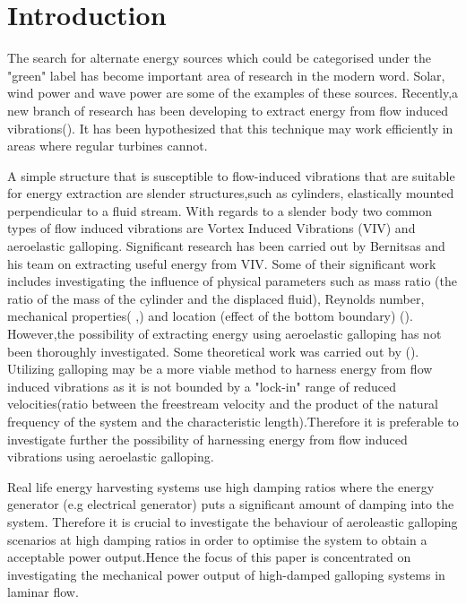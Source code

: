 \section{Introduction} 

The search for alternate energy sources which could be categorised  under the "green" label has become important area of research in the modern word. Solar, wind power and wave power are some of the examples of these sources.  Recently,a new branch of research has been developing to extract energy from flow induced vibrations(\cite{Bernitsas2008a-concept}). It has been hypothesized that this technique may work efficiently in areas where regular turbines cannot. 

A simple structure that is susceptible to flow-induced vibrations that are suitable for energy extraction are slender structures,such as cylinders, elastically mounted perpendicular to a fluid stream. With regards to a slender body two common types of   flow induced vibrations are Vortex Induced Vibrations (VIV) and aeroelastic galloping. Significant research has been carried out by Bernitsas and his team on extracting useful energy from VIV. Some of their significant work includes investigating the influence  of physical parameters such as mass ratio (the ratio of the mass of the cylinder and the displaced fluid), Reynolds number, mechanical properties(\cite{Raghavan2010a} ,\cite{Lee2011b}) and location (effect of the bottom boundary) (\cite{Raghavan2009}). However,the possibility of extracting energy using aeroelastic galloping has not been thoroughly investigated. Some theoretical work was carried out by (\cite{Barrero-Gil2010a}). Utilizing galloping may be a more viable method to harness energy from flow induced vibrations as it is not bounded by a "lock-in" range of reduced velocities(ratio between the freestream velocity and the product of the natural frequency of the system and the characteristic length).Therefore it is preferable to investigate further the possibility of harnessing energy from flow induced vibrations using aeroelastic galloping.

Real life energy harvesting systems use high damping ratios where the energy generator (e.g electrical generator) puts a significant amount of damping into the system. Therefore it is crucial to investigate  the behaviour of aeroleastic galloping scenarios at high damping ratios in order to optimise the system to obtain a acceptable power output.Hence the focus of this paper is concentrated on investigating the mechanical power output of high-damped galloping systems in laminar flow.


